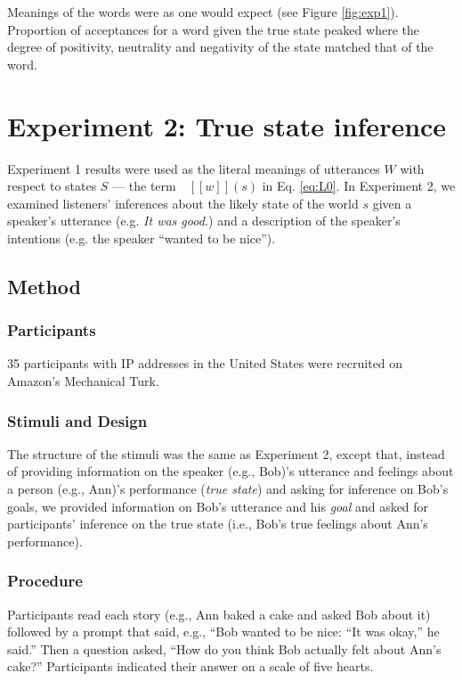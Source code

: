 \documentclass[10pt,letterpaper]{article}
\newcommand{\denote}[1]{\mbox{ $[\![ #1 ]\!]$}}
\newcommand{\ndg}[1]{\textcolor{Green}{[ndg: #1]}}
\begin{document}

Meanings of the words were as one would expect (see Figure \ref{fig:exp1}). 
Proportion of acceptances for a word given the true state peaked where the degree of positivity, neutrality and negativity of the state matched that of the word. 

\section{Experiment 2: True state inference}

Experiment 1 results were used as the literal meanings of utterances $W$ with respect to states $S$ --- the term $\denote{w}(s)$ in Eq. \ref{eq:L0}.
In Experiment 2, we examined listeners' inferences about the likely state of the world $s$ given a speaker's utterance (e.g. \emph{It was good.}) and a description of the speaker's intentions (e.g. the speaker ``wanted to be nice'').

\subsection{Method}

\subsubsection{Participants}

35 participants with IP addresses in the United States were recruited on Amazon's Mechanical Turk. 

\subsubsection{Stimuli and Design}

The structure of the stimuli was the same as Experiment 2, except that, instead of providing information on the speaker (e.g., Bob)'s utterance and feelings about a person (e.g., Ann)'s performance (\emph{true state}) and asking for inference on Bob's goals, we provided information on Bob's utterance and his \emph{goal} and asked for participants' inference on the true state (i.e., Bob's true feelings about Ann's performance).

\subsubsection{Procedure}
Participants read each story (e.g., Ann baked a cake and asked Bob about it) followed by a prompt that said, 
e.g., ``Bob wanted to be nice: ``It was okay,'' he said.''
Then a question asked, ``How do you think Bob actually felt about Ann's cake?''
Participants indicated their answer on a scale of five hearts.
\end{document}
